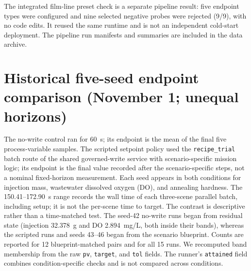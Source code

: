 \documentclass[10pt]{article}
\begin{document}
The integrated film-line preset check is a separate pipeline result: five endpoint types were configured and nine selected negative probes were rejected (9/9), with no code edits. It reused the same runtime and is not an independent cold-start deployment. The pipeline run manifests and summaries are included in the data archive.

\section*{Historical five-seed endpoint comparison (November 1; unequal horizons)}
The no-write control ran for 60~s; its endpoint is the mean of the final five process-variable samples. The scripted setpoint policy used the \texttt{recipe\_trial} batch route of the shared governed-write service with scenario-specific mission logic; its endpoint is the final value recorded after the scenario-specific steps, not a nominal fixed-horizon measurement. Each seed appears in both conditions for injection mass, wastewater dissolved oxygen (DO), and annealing hardness. The 150.41--172.90~s range records the wall time of each three-scene parallel batch, including setup; it is not the per-scene time to target. The contrast is descriptive rather than a time-matched test. The seed-42 no-write runs began from residual state (injection 32.378~g and DO 2.894~mg/L, both inside their bands), whereas the scripted runs and seeds 43--46 began from the scenario blueprint. Counts are reported for 12 blueprint-matched pairs and for all 15 runs. We recomputed band membership from the raw \texttt{pv}, \texttt{target}, and \texttt{tol} fields. The runner's \texttt{attained} field combines condition-specific checks and is not compared across conditions.
\end{document}
